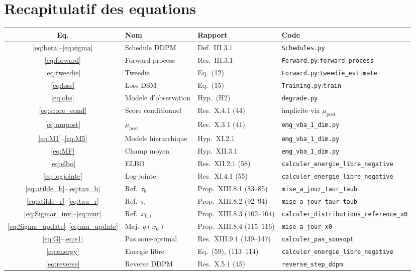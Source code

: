 \documentclass[12pt]{article}
\newcommand{\mupost}{\mu_{\mathrm{post}}}
\newcommand{\file}[1]{\texttt{\color{codeblue}#1}}
\newcommand{\func}[1]{\texttt{\color{codered}#1}}
\begin{document}
\section{Recapitulatif des equations}

\begin{center}
\small
\begin{tabular}{clll}
\toprule
\textbf{Eq.} & \textbf{Nom} & \textbf{Rapport} & \textbf{Code} \\
\midrule
\eqref{eq:beta}--\eqref{eq:sigma} & Schedule DDPM & Def.~III.3.1 & \file{Schedules.py} \\
\eqref{eq:forward} & Forward process & Res.~III.3.1 & \file{Forward.py}:\func{forward\_process} \\
\eqref{eq:tweedie} & Tweedie & Eq.~(12) & \file{Forward.py}:\func{tweedie\_estimate} \\
\eqref{eq:loss} & Loss DSM & Eq.~(15) & \file{Training.py}:\func{train} \\
\eqref{eq:obs} & Modele d'observation & Hyp.~(H2) & \file{degrade.py} \\
\eqref{eq:score_cond} & Score conditionnel & Res.~X.4.1 (44) & implicite via $\mupost$ \\
\eqref{eq:mupost} & $\mupost$ & Res.~X.3.1 (41) & \file{emg\_vba\_1\_dim.py} \\
\eqref{eq:M1}--\eqref{eq:M5} & Modele hierarchique & Hyp.~XI.2.1 & \file{emg\_vba\_1\_dim.py} \\
\eqref{eq:MF} & Champ moyen & Hyp.~XII.3.1 & \file{emg\_vba\_1\_dim.py} \\
\eqref{eq:elbo} & ELBO & Res.~XII.2.1 (58) & \func{calculer\_energie\_libre\_negative} \\
\eqref{eq:logjointe} & Log-jointe & Res.~XI.4.1 (55) & \func{calculer\_energie\_libre\_negative} \\
\eqref{eq:atilde_b}--\eqref{eq:tau_b} & Ref.~$\tau_b$ & Prop.~XIII.8.1 (83--85) & \func{mise\_a\_jour\_taur\_taub} \\
\eqref{eq:atilde_r}--\eqref{eq:tau_r} & Ref.~$\tau_r$ & Prop.~XIII.8.2 (92--94) & \func{mise\_a\_jour\_taur\_taub} \\
\eqref{eq:Sigmar_inv}--\eqref{eq:mur} & Ref.~$x_{0,i}$ & Prop.~XIII.8.3 (102--104) & \func{calculer\_distributions\_reference\_x0} \\
\eqref{eq:Sigma_update}--\eqref{eq:mu_update} & Maj.~$q(x_0)$ & Prop.~XIII.8.4 (115--116) & \func{mise\_a\_jour\_x0} \\
\eqref{eq:G}--\eqref{eq:s1} & Pas sous-optimal & Res.~XIII.9.1 (139--147) & \func{calculer\_pas\_sousopt} \\
\eqref{eq:energy} & Energie libre & Eq.~(59), (113--114) & \func{calculer\_energie\_libre\_negative} \\
\eqref{eq:reverse} & Reverse DDPM & Res.~X.5.1 (45) & \func{reverse\_step\_ddpm} \\
\bottomrule
\end{tabular}
\end{center}
\end{document}

